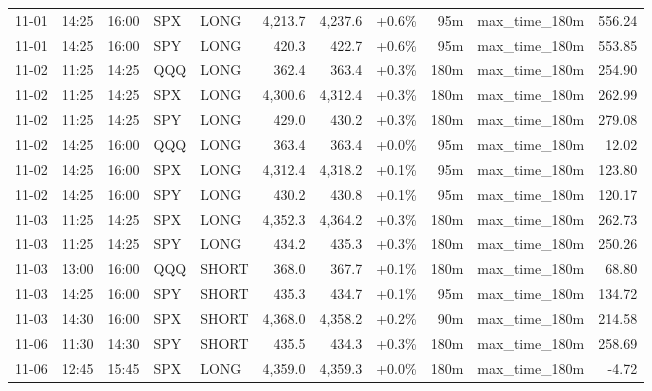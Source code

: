 \documentclass[11pt,a4paper,twoside]{article}
\begin{document}
\begin{center}
\begin{longtable}{>{\color{txtmain}}l l l l l r r r r >{\color{txtmain}}l r}
11-01 & 14:25 & 16:00 & SPX & LONG & 4,213.7 & 4,237.6 & \textcolor{wingreen}{+0.6\%} & 95m & max\_time\_180m & \textcolor{wingreen}{556.24} \\
11-01 & 14:25 & 16:00 & SPY & LONG & 420.3 & 422.7 & \textcolor{wingreen}{+0.6\%} & 95m & max\_time\_180m & \textcolor{wingreen}{553.85} \\
11-02 & 11:25 & 14:25 & QQQ & LONG & 362.4 & 363.4 & \textcolor{wingreen}{+0.3\%} & 180m & max\_time\_180m & \textcolor{wingreen}{254.90} \\
11-02 & 11:25 & 14:25 & SPX & LONG & 4,300.6 & 4,312.4 & \textcolor{wingreen}{+0.3\%} & 180m & max\_time\_180m & \textcolor{wingreen}{262.99} \\
11-02 & 11:25 & 14:25 & SPY & LONG & 429.0 & 430.2 & \textcolor{wingreen}{+0.3\%} & 180m & max\_time\_180m & \textcolor{wingreen}{279.08} \\
11-02 & 14:25 & 16:00 & QQQ & LONG & 363.4 & 363.4 & \textcolor{wingreen}{+0.0\%} & 95m & max\_time\_180m & \textcolor{wingreen}{12.02} \\
11-02 & 14:25 & 16:00 & SPX & LONG & 4,312.4 & 4,318.2 & \textcolor{wingreen}{+0.1\%} & 95m & max\_time\_180m & \textcolor{wingreen}{123.80} \\
11-02 & 14:25 & 16:00 & SPY & LONG & 430.2 & 430.8 & \textcolor{wingreen}{+0.1\%} & 95m & max\_time\_180m & \textcolor{wingreen}{120.17} \\
11-03 & 11:25 & 14:25 & SPX & LONG & 4,352.3 & 4,364.2 & \textcolor{wingreen}{+0.3\%} & 180m & max\_time\_180m & \textcolor{wingreen}{262.73} \\
11-03 & 11:25 & 14:25 & SPY & LONG & 434.2 & 435.3 & \textcolor{wingreen}{+0.3\%} & 180m & max\_time\_180m & \textcolor{wingreen}{250.26} \\
11-03 & 13:00 & 16:00 & QQQ & SHORT & 368.0 & 367.7 & \textcolor{wingreen}{+0.1\%} & 180m & max\_time\_180m & \textcolor{wingreen}{68.80} \\
11-03 & 14:25 & 16:00 & SPY & SHORT & 435.3 & 434.7 & \textcolor{wingreen}{+0.1\%} & 95m & max\_time\_180m & \textcolor{wingreen}{134.72} \\
11-03 & 14:30 & 16:00 & SPX & SHORT & 4,368.0 & 4,358.2 & \textcolor{wingreen}{+0.2\%} & 90m & max\_time\_180m & \textcolor{wingreen}{214.58} \\
11-06 & 11:30 & 14:30 & SPY & SHORT & 435.5 & 434.3 & \textcolor{wingreen}{+0.3\%} & 180m & max\_time\_180m & \textcolor{wingreen}{258.69} \\
11-06 & 12:45 & 15:45 & SPX & LONG & 4,359.0 & 4,359.3 & \textcolor{wingreen}{+0.0\%} & 180m & max\_time\_180m & \textcolor{lossred}{-4.72} \\

\end{longtable}
\end{center}
\end{document}
